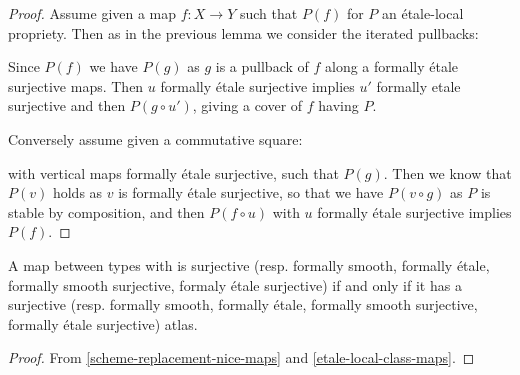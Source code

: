 \begin{proof}
Assume given a map $f:X\to Y$ such that $P(f)$ for $P$ an étale-local propriety. Then as in the previous lemma we consider the iterated pullbacks:
  \begin{center}
  \end{center}
  Since $P(f)$ we have $P(g)$ as $g$ is a pullback of $f$ along a formally étale surjective maps. Then $u$ formally étale surjective implies $u'$ formally etale surjective and then $P(g\circ u')$, giving a cover of $f$ having $P$.
  
  Conversely assume given a commutative square:
  \begin{center}
  \end{center}
  with vertical maps formally étale surjective, such that $P(g)$. Then we know that $P(v)$ holds as $v$ is formally étale surjective, so that we have $P(v\circ g)$ as $P$ is stable by composition, and then $P(f\circ u)$ with $u$ formally étale surjective implies $P(f)$.
\end{proof}

\begin{corollary}
A map between types with is surjective (resp. formally smooth, formally étale, formally smooth surjective, formaly étale surjective) if and only if it has a surjective (resp. formally smooth, formally étale, formally smooth surjective, formally étale surjective) atlas.
\end{corollary}

\begin{proof}
From \cref{scheme-replacement-nice-maps} and \cref{etale-local-class-maps}.
\end{proof}
